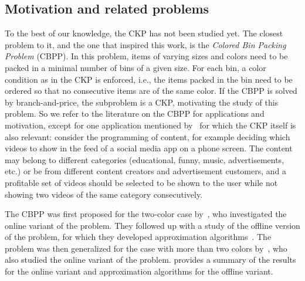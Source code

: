 \documentclass[preprint,11pt]{elsarticle}
\theoremstyle{definition}
\begin{document}
\subsection{Motivation and related problems}
\label{sec:lit}
To the best of our knowledge, the CKP has not been studied yet. 
The closest problem to it, and the one that inspired this work, is the \textit{Colored Bin Packing Problem} (CBPP).
In this problem, items of varying sizes and colors need to be packed in a minimal number of bins of a given size.
For each bin, a color condition as in the CKP is enforced, i.e., the items packed in the bin need to be ordered so that no consecutive items are of the same color.
If the CBPP is solved by branch-and-price, the subproblem is a CKP, motivating the study of this problem.
So we refer to the literature on the CBPP for applications and motivation, except for one application mentioned by~\citet{balogh2013} for which the CKP itself is also relevant:
consider the programming of content, for example deciding which videos to show in the feed of a social media app on a phone screen. 
The content may belong to different categories (educational, funny, music, advertisements, etc.) or be from different content creators and advertisement customers, and a profitable set of videos should be selected to be shown to the user while not showing two videos of the same category consecutively.

The CBPP was first proposed for the two-color case by~\citet{balogh2013}, who investigated the online variant of the problem. 
They followed up with a study of the offline version of the problem, for which they developed approximation algorithms~\citep{balogh_offline_2015}.
The problem was then generalized for the case with more than two colors by~\citet{dosa_colorful_2014}, who also studied the online variant of the problem. 
\citet{BorgesSM24} provides a summary of the results for the online variant and approximation algorithms for the offline variant.
\end{document}
